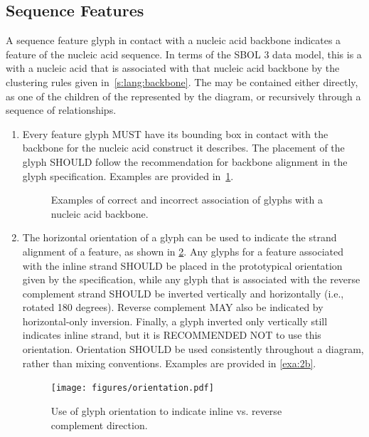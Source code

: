 \subsection{Sequence Features}
\label{s:lang:nacomponent}

A sequence feature glyph in contact with a nucleic acid backbone indicates a feature of the nucleic acid sequence.
% 
In terms of the SBOL 3 data model, this is a  with a nucleic acid  that is associated with that nucleic acid backbone by the clustering rules given in~\ref{s:lang:backbone}.
The  may be contained either directly, as one of the children of the  represented by the diagram, or recursively through a sequence of  relationships.

\begin{enumerate}
\item Every feature glyph MUST have its bounding box in contact with the backbone for the nucleic acid construct it describes. 
The placement of the glyph SHOULD follow the recommendation for backbone alignment in the glyph specification.
	Examples are provided in~\ref{exa:2a}.
   	\begin{figure}[h!]
	\centering
	\caption{Examples of correct and incorrect association of glyphs with a nucleic acid backbone.}
	\label{exa:2a}
	\end{figure}

\item The horizontal orientation of a glyph can be used to indicate the strand alignment of a feature, as shown in \ref{f:orientation}. 
	Any glyphs for a feature associated with the inline strand SHOULD be placed in the prototypical orientation given by the specification,
	while any glyph that is associated with the reverse complement strand SHOULD be inverted vertically and horizontally (i.e., rotated 180 degrees). 
	Reverse complement MAY also be indicated by horizontal-only inversion.
	Finally, a glyph inverted only vertically still indicates inline strand, but it is RECOMMENDED NOT to use this orientation.
	Orientation SHOULD be used consistently throughout a diagram, rather than mixing conventions.
	Examples are provided in \ref{exa:2b}.
	
	\begin{figure}[h!]
	\centering
	\texttt{[image: figures/orientation.pdf]}
	\caption{Use of glyph orientation to indicate inline vs. reverse complement direction.}
	\label{f:orientation}
	\end{figure} 
	

\end{enumerate}
